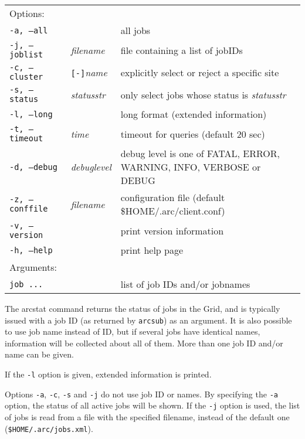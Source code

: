 \begin{shaded}
\end{shaded}
\begin{longtable}{llp{8cm}}
   Options:&&\\
   \texttt{-a, --all}& & all jobs\\
   \texttt{-j, --joblist}& \textit{filename}& file containing a list of jobIDs\\
   \texttt{-c, --cluster}&\verb#[-]#\textit{name}&explicitly select or reject a specific site\\
   \texttt{-s, --status}& \textit{statusstr} &only select jobs whose status is \textit{statusstr}\\
   \texttt{-l, --long}& & long format (extended information)\\
   \texttt{-t, --timeout}& \textit{time}& timeout for queries (default 20 sec)\\
   \texttt{-d, --debug}& \textit{debuglevel}&debug level is one of  FATAL, ERROR, WARNING, INFO, VERBOSE or DEBUG\\
   \texttt{-z, --conffile}&\textit{filename}& configuration file (default {\$}HOME/.arc/client.conf)\\
   \texttt{-v, --version}& & print version information\\
   \texttt{-h, --help}& & print help page\\
   Arguments:&&\\
   \texttt{job ...} && list of job IDs and/or jobnames\\
\end{longtable}

The arcstat command returns the status of jobs in the Grid, and is typically issued with a
job ID (as returned by \verb#arcsub#) as an argument. It is also possible to use job name instead of
ID, but if several jobs have identical names, information will be collected about all of them. 
More than one job ID and/or name can be given.

If the \verb#-l# option is given, extended information is printed.

Options \verb#-a#, \verb#-c#, \verb#-s# and \verb#-j# do not use job ID or names. By
specifying the \verb#-a# option, the status of all active jobs will be shown. If the \verb#-j# option
is used, the list of jobs is read from a file with the specified filename, instead of
the default one (\texttt{{\$}HOME/.arc/jobs.xml}).

